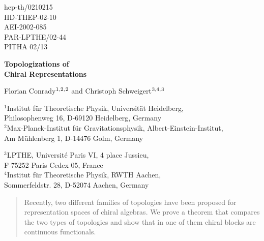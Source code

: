 \documentclass[a4paper,12pt,twoside]{article}
\begin{document}
\thispagestyle{empty}
\hfill
\parbox[t]{3.6cm}{
hep-th/0210215 \\
HD-THEP-02-10 \\
AEI-2002-085 \\
PAR-LPTHE/02-44 \\
PITHA 02/13 \\}
\vspace{2ex}

\begin{center}
\bf\LARGE Topologizations of \\ Chiral Representations
\end{center}

\renewcommand{\thefootnote}{\fnsymbol{footnote}}
\begin{center}
\large Florian Conrady$^{1,2,}\footnotemark[2]$ and Christoph Schweigert$^{3,4,}\footnotemark[3]$
\end{center}
{\small\it
\begin{center}
$^1$Institut f\"{u}r Theoretische Physik, Universit\"{a}t Heidelberg, \\ Philosophenweg 16, D-69120 Heidelberg, Germany \\
$^2$Max-Planck-Institut f\"{u}r Gravitationsphysik, Albert-Einstein-Institut, \\ Am M\"{u}hlenberg 1, D-14476 Golm, Germany
\end{center}
\begin{center}
$^3$LPTHE, Universit\'{e} Paris VI, 4 place Jussieu, \\ F-75252 Paris Cedex 05, France \\
$^4$Institut f\"{u}r Theoretische Physik, RWTH Aachen, \\ Sommerfeldstr. 28, D-52074 Aachen, Germany
\end{center}}
\renewcommand{\thefootnote}{\arabic{footnote}}
\setcounter{footnote}{0}
\begin{abstract}
\noindent
Recently,
two different families of topologies have been proposed for
representation spaces of chiral algebras. We prove a theorem that compares
the two types of topologies
and show that in one of them
chiral blocks are
continuous functionals.
\end{abstract}
\setlength{\jot}{2.5mm}
\end{document}
